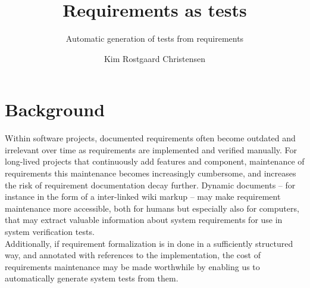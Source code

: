 \documentclass[10pt]{scrartcl}
\author{Kim Rostgaard Christensen}
\title{Requirements as tests}
\subtitle{Automatic generation of tests from requirements}
\begin{document}
\maketitle

\section*{Background}
Within software projects, documented requirements often become outdated
and irrelevant over time as requirements are implemented and verified
manually. For long-lived projects that continuously add features and
component, maintenance of requirements this maintenance becomes
increasingly cumbersome, and increases the risk of requirement
documentation decay further. Dynamic documents -- for instance in the
form of a inter-linked wiki markup -- may make requirement maintenance more
accessible, both for humans but especially also for computers, that may
extract valuable information about system requirements for use in system
verification tests.\\
Additionally, if requirement formalization is in done in a sufficiently
structured way, and annotated with references to the implementation, the
cost of requirements maintenance may be made worthwhile by enabling us
to automatically generate system tests from them.
\end{document}
